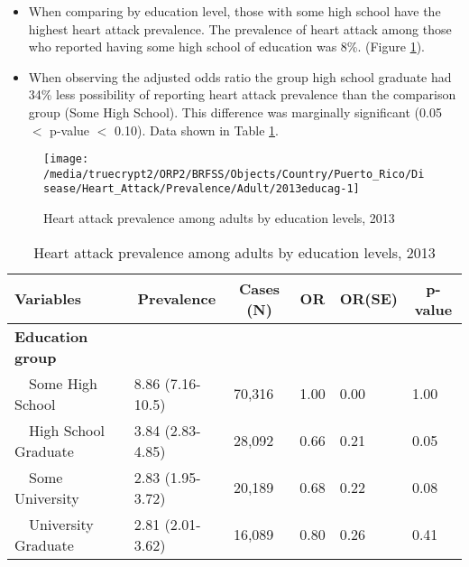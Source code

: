 \newpage
\begin{itemize}

\item When comparing by education level, those with some high school have the highest heart attack prevalence. The prevalence of heart attack among those who reported having some high school of education was 8\%. (Figure \ref{fig:edu.Heart_Attack.2013}).

\item 
When observing the adjusted odds ratio the group high school graduate had 34\% less possibility of reporting heart attack prevalence than the comparison group (Some High School).
This difference was marginally significant (0.05 $<$ p-value $<$ 0.10).  Data shown in Table \ref{tab:edu.Heart_Attack.2013}.

\end{itemize}

\begin{figure}[H]
\caption{Heart attack prevalence among adults by education levels, 
         2013}
\begin{knitrout}
\color{fgcolor}

{\centering \texttt{[image: /media/truecrypt2/ORP2/BRFSS/Objects/Country/Puerto\_Rico/Disease/Heart\_Attack/Prevalence/Adult/2013educag-1]} 

}



\end{knitrout}
 \label{fig:edu.Heart_Attack.2013}
\end{figure}

\begin{table}[H]
\caption{Heart attack prevalence  among adults by education levels, 2013\label{tab:edu.Heart_Attack.2013}} 
\begin{center}
\begin{tabular}{llllll}
\hline\hline
\multicolumn{1}{l}{Variables}&\multicolumn{1}{c}{Prevalence}&\multicolumn{1}{c}{Cases (N)}&\multicolumn{1}{c}{OR}&\multicolumn{1}{c}{OR(SE)}&\multicolumn{1}{c}{p-value}\tabularnewline
\hline
{\bfseries Education group}&&&&&\tabularnewline
~~Some High School&8.86 (7.16-10.5)&70,316&1.00&0.00&1.00\tabularnewline
~~High School Graduate&3.84 (2.83-4.85)&28,092&0.66&0.21&0.05\tabularnewline
~~Some University&2.83 (1.95-3.72)&20,189&0.68&0.22&0.08\tabularnewline
~~University Graduate&2.81 (2.01-3.62)&16,089&0.80&0.26&0.41\tabularnewline
\hline
\end{tabular}\end{center}

\end{table}

